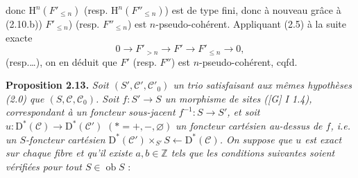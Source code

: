 \documentclass[11pt]{article}
\newcommand{\Spec}{\operatorname{Spec}}
\newcommand{\RRR}{\mathrm{RRR}}
\providecommand{\cC}{\mathcal C}
\providecommand{\Coker}{\operatorname{Coker}}
\providecommand{\Ker}{\operatorname{Ker}}
\providecommand{\cO}{\mathcal O}
\begin{document}
\providecommand{\cS}{\mathcal S}
\providecommand{\cD}{\mathcal D}
\providecommand{\cE}{\mathscr E}
\providecommand{\cG}{\mathscr G}
\providecommand{\cL}{\mathscr L}
\providecommand{\cM}{\mathscr M}
\providecommand{\cP}{\mathscr P}
\providecommand{\cK}{\mathcal K}
\providecommand{\Db}{\mathrm D}
\providecommand{\Kb}{\mathrm K}
\providecommand{\Trc}{\operatorname{Tr}}
\providecommand{\ob}{\operatorname{ob}}
\providecommand{\Coh}{\operatorname{Coh}}
\providecommand{\Cone}{\operatorname{Cone}}
\providecommand{\im}{\operatorname{Im}}
\providecommand{\Id}{\operatorname{Id}}
\providecommand{\RR}{\mathrm{R.R.}}
\providecommand{\RRR}{\mathrm{R.R.R.}}
\providecommand{\GrR}{\mathrm{G}}
\providecommand{\pr}{\operatorname{pr}}
\providecommand{\cC}{\mathcal C}
\providecommand{\cD}{\mathcal D}
\providecommand{\cK}{\mathcal K}
\providecommand{\cO}{\mathcal O}
\providecommand{\cS}{\mathcal S}
\providecommand{\Cpx}{\mathrm C}
\providecommand{\Kpx}{\mathrm K}
\providecommand{\Dpx}{\mathrm D}
\providecommand{\D}{\mathrm D}
\providecommand{\Ho}{\mathrm H}
\providecommand{\RHom}{\mathrm R\!\operatorname{Hom}}
\providecommand{\Ob}{\operatorname{ob}}
\providecommand{\Coker}{\operatorname{Coker}}
\providecommand{\Ker}{\operatorname{Ker}}
\renewcommand{\Im}{\operatorname{Im}}
\providecommand{\Hom}{\operatorname{Hom}}
\providecommand{\Cone}{\operatorname{Cone}}
\providecommand{\id}{\operatorname{Id}}
\providecommand{\qis}{\xrightarrow{\sim}}
\providecommand{\RHom}{\mathrm R\!\Hom}
\providecommand{\Ext}{\operatorname{Ext}}
\providecommand{\coh}{\operatorname{coh}}
\providecommand{\PreCoh}{\operatorname{precoh}}
\providecommand{\Tr}{\operatorname{Tr}}
\providecommand{\Qis}{\operatorname{Qis}}
\providecommand{\Rad}{\operatorname{rad}}
\providecommand{\Spec}{\operatorname{Spec}}
\providecommand{\End}{\operatorname{End}}
\providecommand{\Id}{\operatorname{Id}}
\providecommand{\varinjlim}{\mathop{\mathrm{lim}}\limits_{\longrightarrow}}
\providecommand{\varprojlim}{\mathop{\mathrm{lim}}\limits_{\longleftarrow}}
\providecommand{\qcoh}{\operatorname{qcoh}}
\providecommand{\amp}{\operatorname{amp}}
donc \(\Ho^n(F'_{\leq n})\) (resp. \(\Ho^n(F''_{\leq n})\)) est de type fini, donc à nouveau grâce à (2.10.b)) \(F'_{\leq n}\)) (resp. \(F''_{\leq n}\)) est \(n\)-pseudo-cohérent. Appliquant (2.5) à la suite exacte
\[
  0\longrightarrow F'_{>n}\longrightarrow F'\longrightarrow F'_{\leq n}\longrightarrow 0,
\]
(resp.\dots), on en déduit que \(F'\) (resp. \(F''\)) est \(n\)-pseudo-cohérent, cqfd.

\textbf{Proposition 2.13.} \emph{Soit \((S',\mathcal C',\mathcal C'_0)\) un trio satisfaisant aux mêmes hypothèses (2.0) que \((S,\mathcal C,\mathcal C_0)\). Soit \(f:S'\to S\) un morphisme de sites ([G] I 1.4), correspondant à un foncteur sous-jacent \(f^{-1}:S\to S'\), et soit}
\(u:\Dpx^*(\mathcal C)\longrightarrow \Dpx^*(\mathcal C')\) \((*=+,-,\varnothing)\)
\emph{un foncteur cartésien au-dessus de \(f\), i.e. un \(S\)-foncteur cartésien \(\Dpx^*(\mathcal C')\times_{S'}S\longleftarrow\Dpx^*(\mathcal C)\). On suppose que \(u\) est exact sur chaque fibre et qu'il existe \(a,b\in\mathbb Z\) tels que les conditions suivantes soient vérifiées pour tout \(S\in\Ob S\)} :
\end{document}
